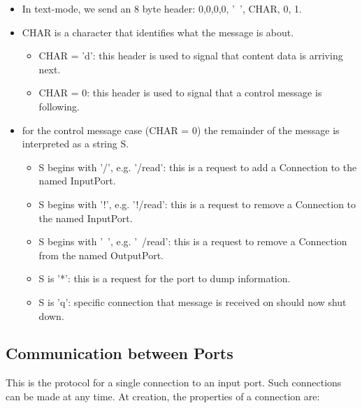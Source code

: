 \documentclass[a4]{article}
\begin{document}
\begin{itemize}

\item In text-mode, we send an 8 byte header: 0,0,0,0, '~', CHAR, 0, 1.

\item CHAR is a character that identifies what the message is about.

  \begin{itemize}
    
  \item CHAR = 'd': this header is used to signal that content data is
  arriving next.
    
  \item CHAR = 0: this header is used to signal that a control message
  is following.

  \end{itemize}

\item for the control message case (CHAR = 0) the remainder of the message 
  is interpreted as a string S.

  \begin{itemize}
   \item S begins with '/', e.g. '/read': this is a request to add a
   Connection to the named InputPort.

   \item S begins with '!', e.g. '!/read': this is a request to remove
   a Connection to the named InputPort.

   \item S begins with '~', e.g. '~/read': this is a request to remove
   a Connection from the named OutputPort.

   \item S is '*': this is a request for the port to dump information.

   \item S is 'q': specific connection that message is received on
   should now shut down.
  \end{itemize}

\end{itemize}




\subsection{Communication between Ports}

This is the protocol for a single connection to an input port.
Such connections can be made at any time.  At creation,
the properties of a connection are:
\end{document}
